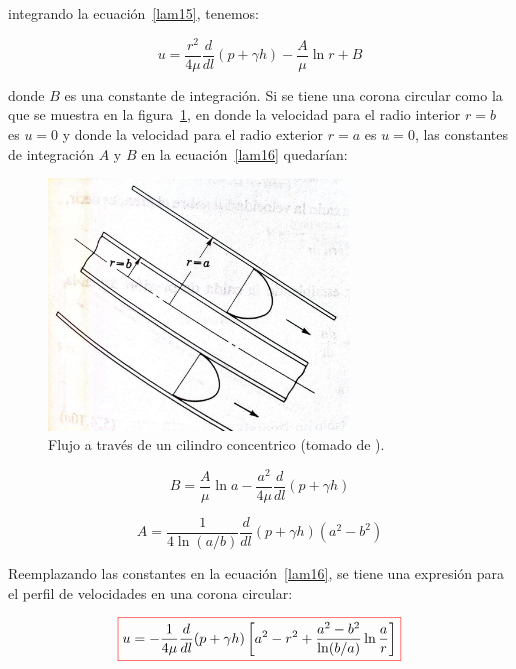 \documentclass[11pt, oneside]{article}
\begin{document}
integrando la ecuaci\'on~\ref{lam15}, tenemos:

\begin{equation}
u = \frac{r^2}{4\mu}\frac{d}{dl}(p + \gamma h) - \frac{A}{\mu} \ln r + B 
\label{lam16}
\end{equation}

donde $B$ es una constante de integraci\'on. Si se tiene una corona circular como la que se muestra en la figura~\ref{lamc}, en donde la velocidad para el radio interior $r=b$ es $u=0$ y donde la velocidad para el radio exterior $r=a$ es $u=0$, las constantes de integraci\'on $A$ y $B$ en la ecuaci\'on~\ref{lam16} quedar\'ian:

\begin{figure}[h]
\centering
\includegraphics[width=8cm]{lamc.jpeg}
\caption{Flujo a trav\'es de un cilindro concentrico (tomado de \cite{streeter}).}
\label{lamc}
\end{figure}

\begin{equation}
B = \frac{A}{\mu}\ln a - \frac{a^2}{4\mu}\frac{d}{dl}(p + \gamma h)
\label{lam17}
\end{equation}

\begin{equation}
A = \frac{1}{4\ln(a/b)} \frac{d}{dl}(p + \gamma h) (a^2 - b^2)
\label{lam18}
\end{equation}

Reemplazando las constantes en la ecuaci\'on~\ref{lam16}, se tiene una expresi\'on para el perfil de velocidades en una corona circular:

\begin{equation}
\color{red}\boxed{\color{black} u = -\frac{1}{4\mu}\frac{d}{dl}(p + \gamma h) \left[ a^2 - r^2 + \frac{a^2 - b^2}{\ln(b/a)} \ln \frac{a}{r} \right ]}
\label{lam19}
\end{equation}
\end{document}

